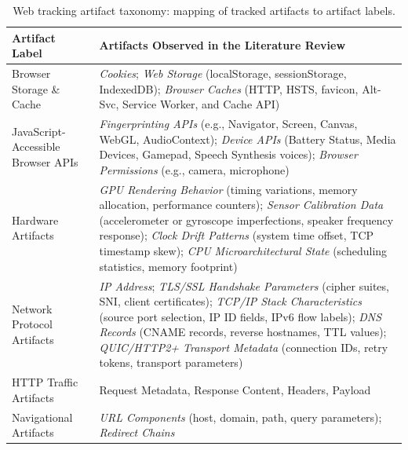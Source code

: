 \begin{table}[ht]
  \small
\centering
\caption{Web tracking artifact taxonomy: mapping of tracked artifacts to artifact labels.}
\label{tab:artifact-taxonomy}
\renewcommand{\arraystretch}{1.2}
\begin{tabular}{@{} p{3.4cm} p{13.8cm} @{}}
\toprule
\textbf{Artifact Label} & \textbf{Artifacts Observed in the Literature Review} \\
\midrule

Browser Storage \& Cache &
  \textit{Cookies};
  \textit{Web Storage} (localStorage, sessionStorage, IndexedDB);
  \textit{Browser Caches} (HTTP, HSTS, favicon, Alt-Svc, Service Worker, and Cache API) \\

\midrule

JavaScript-Accessible Browser APIs &
  \textit{Fingerprinting APIs} (e.g., Navigator, Screen, Canvas, WebGL, AudioContext);
  \textit{Device APIs} (Battery Status, Media Devices, Gamepad, Speech Synthesis voices); 
  \textit{Browser Permissions} (e.g., camera, microphone) \\

\midrule

Hardware Artifacts &
  \textit{GPU Rendering Behavior} (timing variations, memory allocation, performance counters);
  \textit{Sensor Calibration Data} (accelerometer or gyroscope imperfections, speaker frequency response);
  \textit{Clock Drift Patterns} (system time offset, TCP timestamp skew);
  \textit{CPU Microarchitectural State} (scheduling statistics, memory footprint) \\

\midrule

Network Protocol Artifacts &
  \textit{IP Address};
  \textit{TLS/SSL Handshake Parameters} (cipher suites, SNI, client certificates);
  \textit{TCP/IP Stack Characteristics} (source port selection, IP ID fields, IPv6 flow labels);
  \textit{DNS Records} (CNAME records, reverse hostnames, TTL values);
  \textit{QUIC/HTTP2+ Transport Metadata} (connection IDs, retry tokens, transport parameters) \\

\midrule

HTTP Traffic Artifacts &
  Request Metadata, Response Content, Headers, Payload \\

\midrule

Navigational Artifacts &
  \textit{URL Components} (host, domain, path, query parameters);
  \textit{Redirect Chains} \\


\end{tabular}
\end{table}
